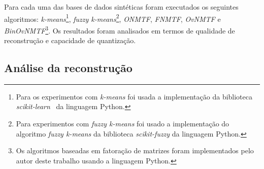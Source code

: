 \documentclass[
    12pt,                %
    oneside,            %
    a4paper,            %
    english,            %
    brazil                %
    ]{abntex2ppgsi}
\begin{document}


Para cada uma das bases de dados sintéticas foram executados os seguintes algoritmos: \textit{k-means}\footnote{Para os experimentos com \textit{k-means} foi usada a implementação da biblioteca \textit{scikit-learn}~\cite{scikitLearn} da linguagem Python.}, \textit{fuzzy k-means}\footnote{Para experimentos com \textit{fuzzy k-means} foi usado a implementação do algoritmo \textit{fuzzy k-means} da biblioteca \textit{scikit-fuzzy} da linguagem Python.}, \textit{ONMTF}, \textit{FNMTF}, \textit{OvNMTF} e \textit{BinOvNMTF}\footnote{Os algoritmos baseadas em fatoração de matrizes foram implementados pelo autor deste trabalho usando a linguagem Python.}.
Os resultados foram analisados em termos de qualidade de reconstrução e capacidade de quantização.

\subsection{Análise da reconstrução}

\end{document}

